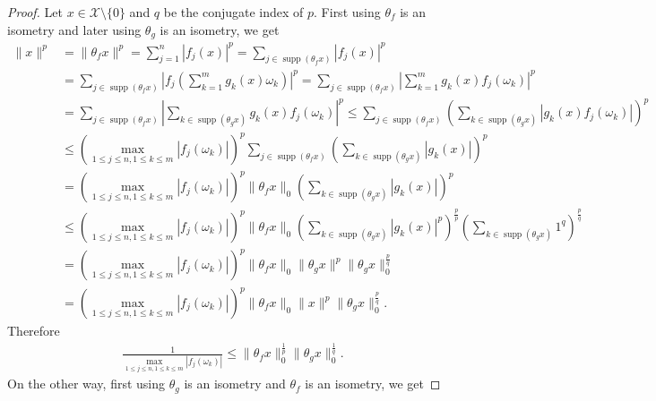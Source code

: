 \documentclass[10pt,a4paper]{amsart}
\begin{document}
\begin{proof}
	Let $x \in \mathcal{X}\setminus\{0\}$ and $q$ be the conjugate index of $p$. First using $\theta_f$ is an isometry and later using $\theta_g$ is an isometry, we get 
	\begin{align*}
\|x\|^p&=\|\theta_fx\|^p=\sum_{j=1}^n|f_j(x)|^p=\sum_{j \in \operatorname{supp}(\theta_fx)}|f_j(x)|^p\\
&=\sum_{j\in \operatorname{supp}(\theta_fx)}\left|f_j\left(\sum_{k=1}^mg_k(x)\omega_k\right)\right|^p
=\sum_{j \in \operatorname{supp}(\theta_fx)}\left|\sum_{k=1}^mg_k(x)f_j(\omega_k)\right|^p\\
&=\sum_{j \in \operatorname{supp}(\theta_fx)}\left|\sum_{k \in  \operatorname{supp}(\theta_gx)}g_k(x)f_j(\omega_k)\right|^p\leq \sum_{j \in \operatorname{supp}(\theta_fx)}\left(\sum_{k \in  \operatorname{supp}(\theta_gx)}|g_k(x)f_j(\omega_k)|\right)^p\\
&\leq \left(\displaystyle\max_{1\leq j\leq n, 1\leq k\leq m}|f_j(\omega_k)|\right)^p\sum_{j \in \operatorname{supp}(\theta_fx)}\left(\sum_{k \in  \operatorname{supp}(\theta_gx)}|g_k(x)|\right)^p\\
&=\left(\displaystyle\max_{1\leq j\leq n, 1\leq k\leq m}|f_j(\omega_k)|\right)^p \|\theta_f x\|_0\left(\sum_{k \in  \operatorname{supp}(\theta_gx)}|g_k(x)|\right)^p\\
&\leq \left(\displaystyle\max_{1\leq j\leq n, 1\leq k\leq m}|f_j(\omega_k)|\right)^p \|\theta_f x\|_0\left(\sum_{k \in  \operatorname{supp}(\theta_gx)}|g_k(x)|^p\right)^\frac{p}{p}\left(\sum_{k \in  \operatorname{supp}(\theta_gx)}1^q\right)^\frac{p}{q}\\
&=\left(\displaystyle\max_{1\leq j\leq n, 1\leq k\leq m}|f_j(\omega_k)|\right)^p \|\theta_f x\|_0\|\theta_g x\|^p\|\theta_g x\|_0^\frac{p}{q}\\
&=\left(\displaystyle\max_{1\leq j\leq n, 1\leq k\leq m}|f_j(\omega_k)|\right)^p \|\theta_f x\|_0\|x\|^p\|\theta_g x\|_0^\frac{p}{q}.
	\end{align*}
Therefore 
\begin{align*}
	\frac{1}{\displaystyle\max_{1\leq j\leq n, 1\leq k\leq m}|f_j(\omega_k)|}\leq \|\theta_f x\|_0^\frac{1}{p}\|\theta_g x\|_0^\frac{1}{q}.
\end{align*}
On the other way, first using $\theta_g$ is an isometry and $\theta_f$ is an isometry, we get


\end{proof}
\end{document}
